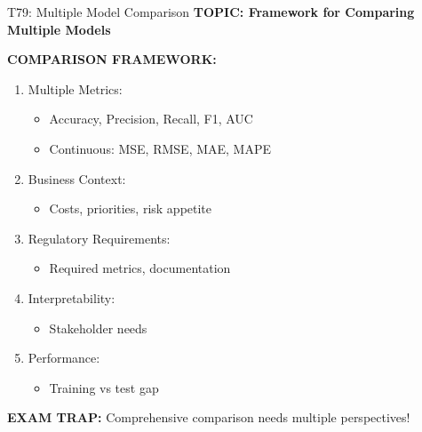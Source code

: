 \documentclass[8pt]{beamer}
\begin{document}
	\begin{frame}{T79: Multiple Model Comparison}
		\fontsize{6.5}{7.5}\selectfont
		\textbf{TOPIC: Framework for Comparing Multiple Models}
		
		\vspace{0.1cm}
		\textbf{COMPARISON FRAMEWORK:}
		\begin{enumerate}
			\item \textcolor{myblue}{Multiple Metrics:}
			\begin{itemize}
				\item Accuracy, Precision, Recall, F1, AUC
				\item Continuous: MSE, RMSE, MAE, MAPE
			\end{itemize}
			
			\item \textcolor{myblue}{Business Context:}
			\begin{itemize}
				\item Costs, priorities, risk appetite
			\end{itemize}
			
			\item \textcolor{myblue}{Regulatory Requirements:}
			\begin{itemize}
				\item Required metrics, documentation
			\end{itemize}
			
			\item \textcolor{myblue}{Interpretability:}
			\begin{itemize}
				\item Stakeholder needs
			\end{itemize}
			
			\item \textcolor{myblue}{Performance:}
			\begin{itemize}
				\item Training vs test gap
			\end{itemize}
		\end{enumerate}
		
		\textcolor{myred}{\textbf{EXAM TRAP:}} Comprehensive comparison needs multiple perspectives!
	\end{frame}
	
\end{document}
